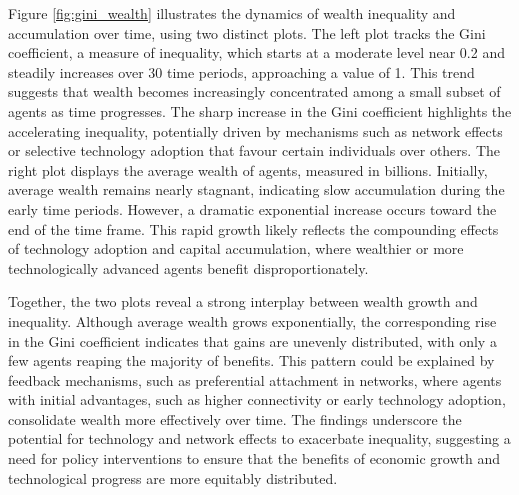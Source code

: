 \documentclass[12pt]{article}
\begin{document}
Figure \ref{fig:gini_wealth} illustrates the dynamics of wealth inequality and accumulation over time, using two distinct plots. The left plot tracks the Gini coefficient, a measure of inequality, which starts at a moderate level near 0.2 and steadily increases over 30 time periods, approaching a value of 1. This trend suggests that wealth becomes increasingly concentrated among a small subset of agents as time progresses. The sharp increase in the Gini coefficient highlights the accelerating inequality, potentially driven by mechanisms such as network effects or selective technology adoption that favour certain individuals over others. The right plot displays the average wealth of agents, measured in billions. Initially, average wealth remains nearly stagnant, indicating slow accumulation during the early time periods. However, a dramatic exponential increase occurs toward the end of the time frame. This rapid growth likely reflects the compounding effects of technology adoption and capital accumulation, where wealthier or more technologically advanced agents benefit disproportionately. 

Together, the two plots reveal a strong interplay between wealth growth and inequality. Although average wealth grows exponentially, the corresponding rise in the Gini coefficient indicates that gains are unevenly distributed, with only a few agents reaping the majority of benefits. This pattern could be explained by feedback mechanisms, such as preferential attachment in networks, where agents with initial advantages, such as higher connectivity or early technology adoption, consolidate wealth more effectively over time. The findings underscore the potential for technology and network effects to exacerbate inequality, suggesting a need for policy interventions to ensure that the benefits of economic growth and technological progress are more equitably distributed.
\end{document}
